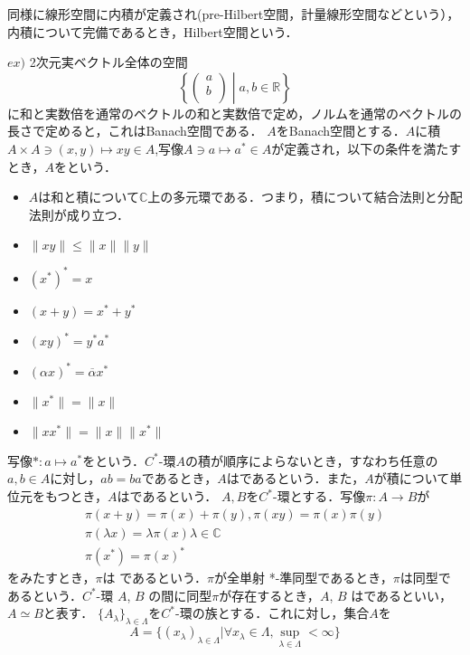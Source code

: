 同様に線形空間に内積が定義され(pre-Hilbert空間，計量線形空間などという），内積について完備であるとき，Hilbert空間という．

$ex)$ 2次元実ベクトル全体の空間
\[\left\{ \left(
\begin{array}{c}
a \\
b \\
\end{array}
\right)\mathrel{}\middle|\mathrel{}a,b\in \mathbb{R}\right\}\]
に和と実数倍を通常のベクトルの和と実数倍で定め，ノルムを通常のベクトルの長さで定めると，これはBanach空間である．
$A$をBanach空間とする．$A$に積$A \times A \ni \left(x,y\right) \mapsto xy \in A$,写像$A\ni a \mapsto a^*\in A$が定義され，以下の条件を満たすとき，$A$をという．
\begin{itemize}
\item $A$は和と積について$\mathbb C$上の多元環である．つまり，積について結合法則と分配法則が成り立つ．
\item $\lVert xy\rVert \leq \lVert x\rVert \lVert y\rVert$
\item $\left(x^*\right)^*=x$
\item $\left(x+y\right)=x^*+y^*$
\item $\left(xy\right)^*=y^*a^*$
\item $\left(\alpha x\right)^*=\overline{\alpha} x^*$
\item $\lVert x^*\rVert=\lVert x\rVert$
\item $\lVert xx^*\rVert=\lVert x\rVert \lVert x^*\rVert$
\end{itemize}
写像$*:a \mapsto a^*$をという．$C^*$-環$A$の積が順序によらないとき，すなわち任意の$a,b\in A$に対し，$ab=ba$であるとき，$A$はであるという．また，$A$が積について単位元をもつとき，$A$はであるという．
$A,B$を$C^*$-環とする．写像$\pi:A \rightarrow B$が
\begin{gather*}
\pi(x+y)=\pi(x)+\pi(y),　\pi(xy)=\pi(x)\pi(y) \\
\pi(\lambda x)=\lambda \pi(x)　\lambda \in \mathbb{C} \\
\pi(x^*)=\pi(x)^*
\end{gather*}
をみたすとき，$\pi$は であるという．$\pi $が全単射 *-準同型であるとき，$\pi$は同型であるという．$C^*$-環 $A$, $B$ の間に同型$\pi$が存在するとき，$A$, $B$ はであるといい，$A\simeq B$と表す．
$\{A_{\lambda}\}_{\lambda \in \Lambda}$を$C^*$-環の族とする．これに対し，集合$A$を
\[A=\{ \left( x_{\lambda}\right)_{\lambda \in \Lambda}|\forall x_{\lambda}\in \Lambda ,
\sup_{\lambda \in \Lambda}<\infty \}\] %
